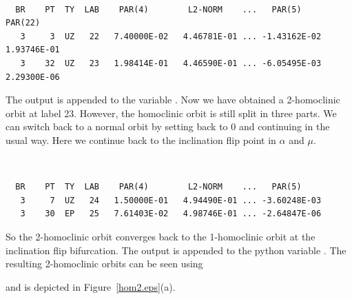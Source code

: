 \documentclass[12pt]{report}
\begin{document}
\begin{center}
 \\
\end{center} 
\begin{verbatim}
  BR    PT  TY  LAB    PAR(4)        L2-NORM    ...   PAR(5)        PAR(22)    
   3     3  UZ   22   7.40000E-02   4.46781E-01 ... -1.43162E-02   1.93746E-01
   3    32  UZ   23   1.98414E-01   4.46590E-01 ... -6.05495E-03   2.29300E-06
\end{verbatim}
The output is appended to the \python variable .
Now we have obtained a 2-homoclinic orbit at label 23. However, the
homoclinic orbit is still split in three parts. We can switch back to
a normal orbit by setting  back to 0 and continuing in the usual
way. Here we continue back to the inclination flip point in $\alpha$
and $\mu$.
\begin{center}
 \\
\end{center} 
\begin{verbatim}
  BR    PT  TY  LAB    PAR(4)        L2-NORM    ...   PAR(5)     
   3     7  UZ   24   1.50000E-01   4.94490E-01 ... -3.60248E-03
   3    30  EP   25   7.61403E-02   4.98746E-01 ... -2.64847E-06
\end{verbatim}
So the 2-homoclinic orbit converges back to the 1-homoclinic orbit at
the inclination flip bifurcation.
The output is appended to the python variable .
The resulting 2-homoclinic orbits can be seen using
\begin{center}
\end{center} 
and is depicted in Figure~\ref{hom2.eps}(a).
\end{document}
